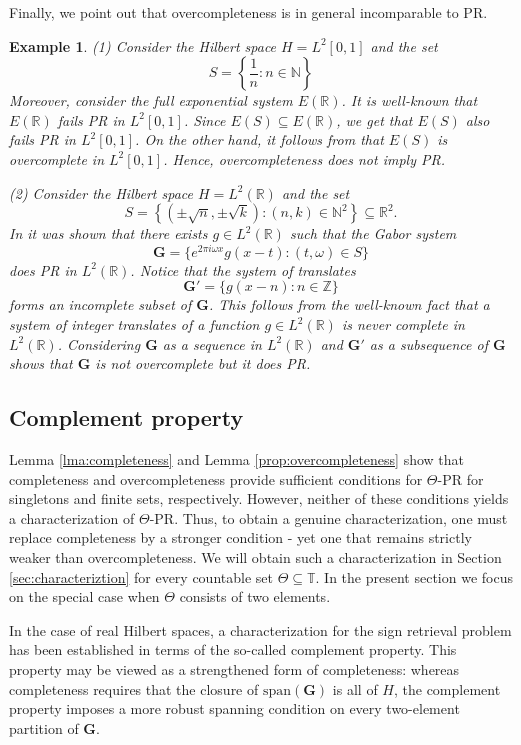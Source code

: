 \documentclass[reqno,a4paper,11pt]{amsart}
\numberwithin{equation}{section}
\newtheorem{example}[definition]{Example}
\def\N{{\mathbb N}}
\def\Z{{\mathbb Z}}
\def\R{{\mathbb R}}
\def\T{{\mathbb T}}
\newcommand{\lspan}{{\mathrm{span}}}
\newcommand{\lt}{{L^2(\R)}}
\newcommand\1{\mathds{1}}
\begin{document}
Finally, we point out that overcompleteness is in general incomparable to PR.

\begin{example}
    (1) Consider the Hilbert space $H = L^2[0,1]$ and the set
    $$
    S = \left \{ \frac{1}{n} : n \in \N \right \}
    $$
    Moreover, consider the full exponential system $E(\R)$. It is well-known that $E(\R)$ fails PR in $L^2[0,1]$. Since $E(S)\subseteq E(\R)$, we get that $E(S)$ also fails PR in $L^2[0,1]$. On the other hand, it follows from \cite{chalendar2006overcompleteness} that $E(S)$ is overcomplete in $L^2[0,1]$. Hence, overcompleteness does not imply PR.

    (2) Consider the Hilbert space $H=L^2(\R)$ and the set
    $$
    S = \left \{ (\pm \sqrt{n},\pm \sqrt{k}) : (n,k) \in \N^2 \right \} \subseteq \R^2.
    $$
    In \cite{grohs2025phaselesssquareroot} it was shown that there exists $g \in \lt$ such that the Gabor system
    $$
    \mathbf{G} = \{ e^{2\pi i \omega x} g(x-t): (t,\omega) \in S \}
    $$
    does PR in $L^2(\R)$. Notice that the system of translates
    $$
    \mathbf{G}' = \{g(x-n) : n \in \Z \}
    $$
    forms an incomplete subset of $\mathbf{G}$. This follows from the well-known fact that a system of integer translates of a function $g \in \lt$ is never complete in $\lt$. Considering $\mathbf{G}$ as a sequence in $\lt$ and $\mathbf{G}'$ as a subsequence of $\mathbf{G}$ shows that $\mathbf{G}$ is not overcomplete but it does PR. 
\end{example}


\subsection{Complement property}\label{sec:complement_property}

Lemma \ref{lma:completeness} and Lemma \ref{prop:overcompleteness} show that completeness and overcompleteness provide sufficient conditions for $\Theta$-PR for singletons and finite sets, respectively. However, neither of these conditions yields a characterization of $\Theta$-PR. Thus, to obtain a genuine characterization, one must replace completeness by a stronger condition - yet one that remains strictly weaker than overcompleteness. We will obtain such a characterization in Section \ref{sec:characteriztion} for every countable set $\Theta \subseteq \T$. In the present section we focus on the special case when $\Theta$ consists of two elements.

In the case of real Hilbert spaces, a characterization for the sign retrieval problem has been established in terms of the so-called complement property. This property may be viewed as a strengthened form of completeness: whereas completeness requires that the closure of $\lspan(\mathbf{G})$ is all of $H$, the complement property imposes a more robust spanning condition on every two-element partition of $\mathbf{G}$.
\end{document}
